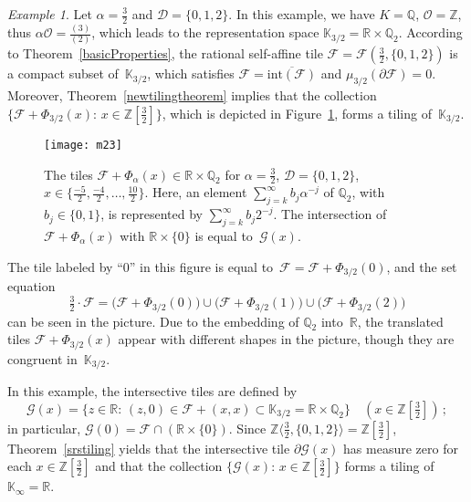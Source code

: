 \documentclass[12pt]{amsart}
\theoremstyle{definition}
\theoremstyle{remark}
\newtheorem{example}[lemma]{Example}
\numberwithin{equation}{section}
\begin{document}
\begin{example}\label{ex:1}
Let $\alpha = \frac{3}{2}$ and $\mathcal{D} = \{0,1,2\}$.
In this example, we have $K = \mathbb{Q}$, $\mathcal{O} = \mathbb{Z}$, thus $\alpha \mathcal{O} = \frac{(3)}{(2)}$, which leads to the representation space $\mathbb{K}_{3/2} = \mathbb{R} \times \mathbb{Q}_2$.
According to Theorem~\ref{basicProperties}, the rational self-affine tile $\mathcal{F} = \mathcal{F}(\frac{3}{2}, \{0,1,2\})$ is a compact subset of~$\mathbb{K}_{3/2}$, which satisfies $\mathcal{F} = \overline{\mathrm{int}(\mathcal{F})}$ and $\mu_{3/2}(\partial \mathcal{F}) = 0$.
Moreover, Theorem~\ref{newtilingtheorem} implies that the collection $\{\mathcal{F} + \Phi_{3/2}(x):\, x \in \mathbb{Z}[\frac{3}{2}]\}$, which is depicted in Figure~\ref{fig:m23}, forms a tiling of~$\mathbb{K}_{3/2}$.

\begin{figure}[ht]
\texttt{[image: m23]}
\caption{The tiles $\mathcal{F} + \Phi_\alpha(x) \in \mathbb{R} \times \mathbb{Q}_2$ for $\alpha=\frac{3}{2}$, $\mathcal{D} = \{0,1,2\}$, $x \in \{\frac{-5}{2},\frac{-4}{2},\ldots,\frac{10}{2}\}$.
Here, an element $\sum_{j=k}^\infty b_j \alpha^{-j}$ of $\mathbb{Q}_2$, with $b_j \in \{0,1\}$, is represented by $\sum_{j=k}^\infty b_j 2^{-j}$.
The intersection of $\mathcal{F} + \Phi_\alpha(x)$ with $\mathbb{R} \times \{0\}$ is equal to~$\mathcal{G}(x)$.} \label{fig:m23}
\end{figure}

The tile labeled by ``$0$'' in this figure is equal to~$\mathcal{F}=\mathcal{F} + \Phi_{3/2}(0)$, and the set equation
\[
\tfrac{3}{2} \cdot \mathcal{F} = \big(\mathcal{F} + \Phi_{3/2}(0)\big) \cup \big(\mathcal{F} + \Phi_{3/2}(1)\big) \cup \big(\mathcal{F} + \Phi_{3/2}(2)\big)
\]
can be seen in the picture.
Due to the embedding of $\mathbb{Q}_2$ into~$\mathbb{R}$, the translated tiles $\mathcal{F} + \Phi_{3/2}(x)$ appear with different shapes in the picture, though they are congruent in~$\mathbb{K}_{3/2}$. 

In this example, the intersective tiles are defined by
\[
\mathcal{G}(x) = \big\{z \in \mathbb{R}:\, (z,0) \in \mathcal{F} + (x,x) \subset \mathbb{K}_{3/2} = \mathbb{R} \times \mathbb{Q}_2\big\}\quad (x\in \mathbb{Z}[\tfrac32])\,;
\]
in particular, $\mathcal{G}(0) = \mathcal{F} \cap (\mathbb{R}\times \{0\})$. Since $\mathbb{Z}\langle \frac32,\{0,1,2\}\rangle = \mathbb{Z}[\frac32]$, Theorem~\ref{srstiling} yields that the intersective tile $\partial \mathcal{G}(x)$ has measure zero for each $x\in\mathbb{Z}[\tfrac32]$ and that the collection $\{\mathcal{G}(x):\, x \in \mathbb{Z}[\tfrac32]\}$ forms a tiling of $\mathbb{K}_\infty=\mathbb{R}$. 


\end{example}
\end{document}
